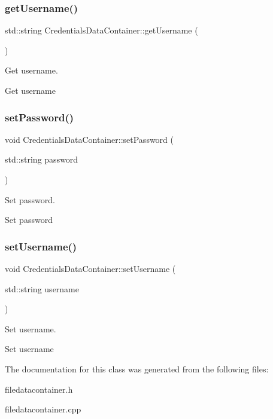 \subsubsection{\texorpdfstring{getUsername()}{getUsername()}}
{\footnotesize\ttfamily std\+::string Credentials\+Data\+Container\+::get\+Username (\begin{DoxyParamCaption}{ }\end{DoxyParamCaption})}



Get username. 

Get username \mbox{\label{classCredentialsDataContainer_a73bf6ee1097d89c197e1da4b2d7797af}} 
\subsubsection{\texorpdfstring{setPassword()}{setPassword()}}
{\footnotesize\ttfamily void Credentials\+Data\+Container\+::set\+Password (\begin{DoxyParamCaption}\item[{std\+::string}]{password }\end{DoxyParamCaption})}



Set password. 

Set password \mbox{\label{classCredentialsDataContainer_af40a1051ec6b24efa275b6555c7a7386}} 
\subsubsection{\texorpdfstring{setUsername()}{setUsername()}}
{\footnotesize\ttfamily void Credentials\+Data\+Container\+::set\+Username (\begin{DoxyParamCaption}\item[{std\+::string}]{username }\end{DoxyParamCaption})}



Set username. 

Set username 

The documentation for this class was generated from the following files\+:\begin{DoxyCompactItemize}
\item 
filedatacontainer.\+h\item 
filedatacontainer.\+cpp\end{DoxyCompactItemize}
